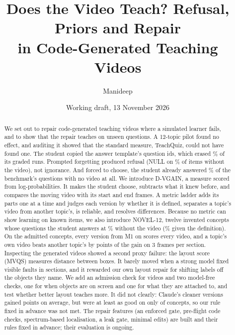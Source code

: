 \documentclass[10pt,twocolumn]{article}
\title{Does the Video Teach? Refusal, Priors and Repair\\in Code-Generated Teaching Videos}
\author{Manideep}
\date{Working draft, 13 November 2026}
\begin{document}
\maketitle

\begin{abstract}
We set out to repair code-generated teaching videos where a simulated learner fails, and to show that the repair
teaches on unseen questions. A 12-topic pilot found no effect, and auditing it showed that the standard measure,
TeachQuiz, could not have found one. The student copied the answer template's question ids, which erased
\OrderShare\% of its graded runs. Prompted forgetting produced refusal (NULL on \NullNoVideo\% of items without the
video), not ignorance. And forced to choose, the student already answered \mmmcpriorGemmaAcc\% of the benchmark's
questions with no video at all. We introduce D-VGAIN, a measure scored from log-probabilities. It makes the student choose,
subtracts what it knew before, and compares the moving video with its start and end frames. A metric ladder adds its parts one at a time and judges each version by whether it is
defined, separates a topic's video from another topic's, is reliable, and resolves differences. Because no metric can
show learning on known items, we also introduce NOVEL-12, twelve invented concepts whose questions the student
answers at \novelpriorGemmaAcc\% without the video (\novelcardGemmaAcc\% given the definition). On the
\LadNovelTopics{} admitted concepts, every version from M1 on scores every video, and a topic's own video beats
another topic's by \LadNovelSepNine{} points of the gain on 3 frames per section. Inspecting the generated videos
showed a second proxy failure: the layout score (MVQS) measures distance between boxes. It barely moved when a strong
model fixed \ClaudeFaults{} visible faults in \ClaudeSections{} sections, and it rewarded our own layout repair for
shifting labels off the objects they name. We add an admission check for videos and two model-free checks, one for
when objects are on screen and one for what they are attached to, and test whether better layout teaches more. It did not clearly: Claude's cleaner versions
gained \LSDiff{} points on average, but were at least as good on only \LSWins{} of \LSN{} concepts, so our rule fixed in advance
was not met. The
repair features (an enforced gate, pre-flight code checks, spectrum-based localisation, a leak gate, minimal edits)
are built and their rules fixed in advance; their evaluation is ongoing.
\end{abstract}















\end{document}

